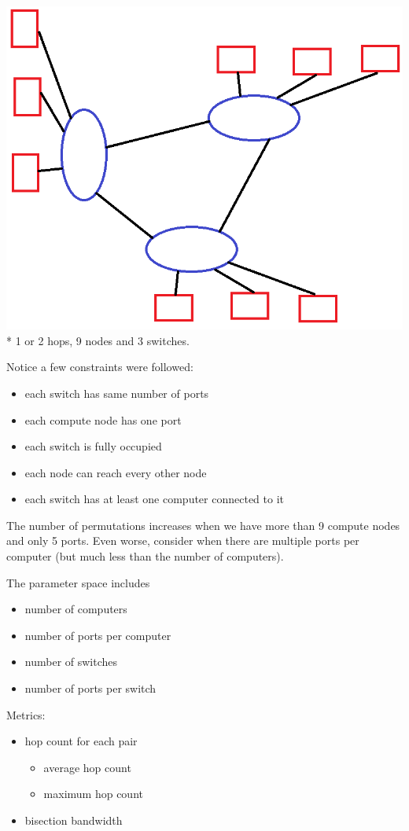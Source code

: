 \documentclass[pdftex]{article}
\begin{document}
\begin{center}
\includegraphics[scale=0.2]{S3_C9.png}\\*
\footnotesize{1 or 2 hops, 9 nodes and 3 switches.}
\end{center}

Notice a few constraints were followed:
\begin{itemize}
 \item each switch has same number of ports
 \item each compute node has one port
 \item each switch is fully occupied
 \item each node can reach every other node
 \item each switch has at least one computer connected to it
\end{itemize}

The number of permutations increases when we have more than 9 compute nodes and only 5 ports. Even worse, consider when there are multiple ports per computer (but much less than the number of computers).

The parameter space includes
\begin{itemize}
 \item number of computers
 \item number of ports per computer
 \item number of switches
 \item number of ports per switch
\end{itemize}
Metrics:
\begin{itemize}
 \item hop count for each pair
 \begin{itemize}
  \item average hop count
  \item maximum hop count
 \end{itemize}
 \item bisection bandwidth
\end{itemize}
\end{document}
